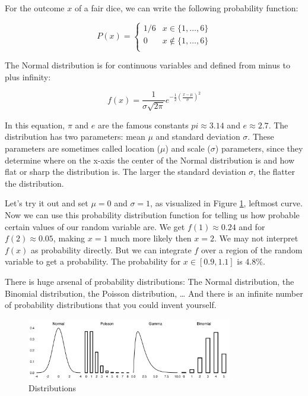 \documentclass[
  10pt,
]{scrbook}
\begin{document}
For the outcome \(x\) of a fair dice, we can write the following probability function:

\[
P(x) = 
\begin{cases}
 1/6 & x \in \{1, \ldots, 6\} \\
 0 & x \notin \{1, \ldots, 6\} \\
\end{cases}
\]

The Normal distribution is for continuous variables and defined from minus to plus infinity:

\[f(x) = \frac{1}{\sigma \sqrt{2\pi}} e^{-\frac{1}{2}\left(\frac{x-\mu}{\sigma}\right)^2}\]

In this equation, \(\pi\) and \(e\) are the famous constants \(pi \approx 3.14\) and \(e \approx 2.7\).
The distribution has two parameters: mean \(\mu\) and standard deviation \(\sigma\).
These parameters are sometimes called location (\(\mu\)) and scale (\(\sigma\)) parameters, since they determine where on the x-axis the center of the Normal distribution is and how flat or sharp the distribution is.
The larger the standard deviation \(\sigma\), the flatter the distribution.

Let's try it out and set \(\mu = 0\) and \(\sigma = 1\), as visualized in Figure \ref{fig:distributions}, leftmost curve.
Now we can use this probability distribution function for telling us how probable certain values of our random variable are.
We get \(f(1) \approx 0.24\) and for \(f(2) \approx 0.05\), making \(x=1\) much more likely then \(x=2\).
We may not interpret \(f(x)\) as probability directly.
But we can integrate \(f\) over a region of the random variable to get a probability.
The probability for \(x \in [0.9, 1.1]\) is 4.8\%.

There is huge arsenal of probability distributions: The Normal distribution, the Binomial distribution, the Poisson distribution, \ldots{}
And there is an infinite number of probability distributions that you could invent yourself.

\begin{figure}

{\centering \includegraphics[width=0.8\textwidth]{figures/distributions-1} 

}

\caption{Distributions}\label{fig:distributions}
\end{figure}
\end{document}
